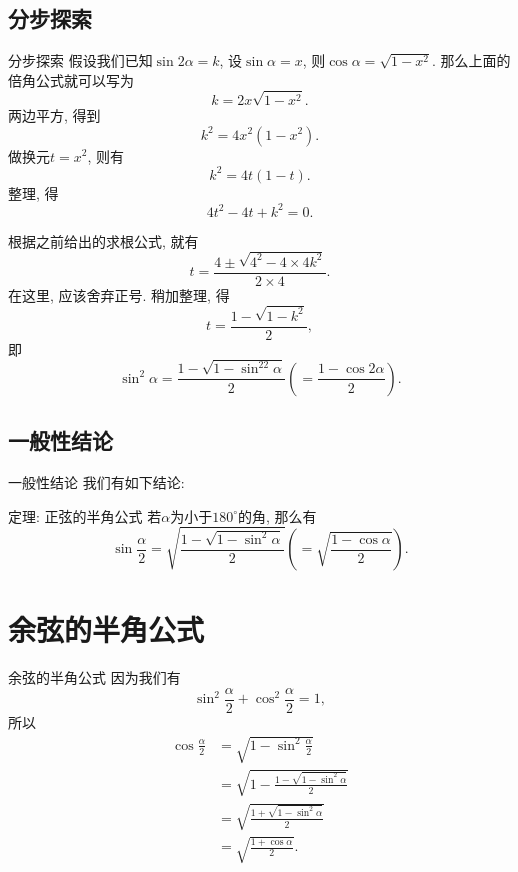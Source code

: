 \documentclass[serif]{beamer}
\begin{document}
\subsection{\kaishu 分步探索}

\begin{frame}{\kaishu 分步探索}
	假设我们已知$\sin2\alpha=k$, 设$\sin\alpha=x$, 则$\cos\alpha=\sqrt{1-x^2}$. 那么上面的倍角公式就可以写为
	\[k=2x\sqrt{1-x^2}.\]
	两边平方, 得到
	\[k^2=4x^2(1-x^2).\]
	做换元$t=x^2$, 则有
	\[k^2=4t(1-t).\]
	整理, 得
	\[4t^2-4t+k^2=0.\]
\end{frame}

\begin{frame}
	根据之前给出的求根公式, 就有
	\[t=\frac{4\pm\sqrt{4^2-4\times4k^2}}{2\times4}.\]
	在这里, 应该舍弃正号. 稍加整理, 得
	\[t=\frac{1-\sqrt{1-k^2}}{2},\]
	即
	\[\sin^2\alpha=\frac{1-\sqrt{1-\sin^22\alpha}}{2}\left(=\frac{1-\cos2\alpha}{2}\right).\]
\end{frame}

\subsection{\kaishu 一般性结论}

\begin{frame}{\kaishu 一般性结论}
	我们有如下结论:
	\begin{block}{{\heiti 定理}: {\fangsong 正弦的半角公式}}
		\kaishu
		若$\alpha$为小于$180^\circ$的角, 那么有
		\[\sin\frac{\alpha}{2}=\sqrt{\frac{1-\sqrt{1-\sin^2\alpha}}{2}}\left(=\sqrt{\frac{1-\cos\alpha}{2}}\right).\]
	\end{block}
\end{frame}

\section{\heiti *余弦的半角公式}

\begin{frame}{\heiti *余弦的半角公式}
	因为我们有
	\[\sin^2\frac\alpha2+\cos^2\frac\alpha2=1,\]
	所以
	\begin{align*}
		\cos\frac\alpha2&=\sqrt{1-\sin^2\frac\alpha2}\\
		&=\sqrt{1-\frac{1-\sqrt{1-\sin^2\alpha}}{2}}\\
		&=\sqrt{\frac{1+\sqrt{1-\sin^2\alpha}}{2}}\\
		&=\sqrt{\frac{1+\cos\alpha}{2}}.
	\end{align*}
\end{frame}
\end{document}
